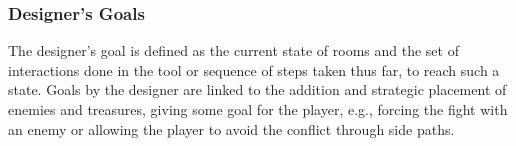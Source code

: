 






\subsubsection{Designer's Goals}


The designer's goal is defined as the current state of rooms and the set of interactions done in the tool or sequence of steps taken thus far, to reach such a state. Goals by the designer are linked to the addition and strategic placement of enemies and treasures, giving some goal for the player, e.g., forcing the fight with an enemy or allowing the player to avoid the conflict through side paths.

